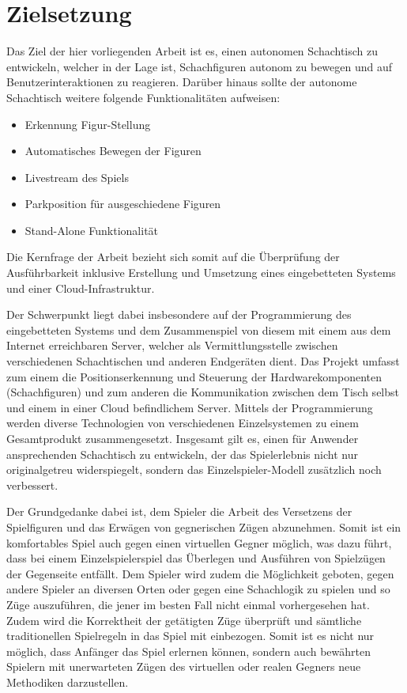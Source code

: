 \hypertarget{zielsetzung}{%
\section{Zielsetzung}\label{zielsetzung}}

Das Ziel der hier vorliegenden Arbeit ist es, einen autonomen
Schachtisch zu entwickeln, welcher in der Lage ist, Schachfiguren
autonom zu bewegen und auf Benutzerinteraktionen zu reagieren. Darüber
hinaus sollte der autonome Schachtisch weitere folgende Funktionalitäten
aufweisen:

\begin{itemize}
\tightlist
\item
  Erkennung Figur-Stellung
\item
  Automatisches Bewegen der Figuren
\item
  Livestream des Spiels
\item
  Parkposition für ausgeschiedene Figuren
\item
  Stand-Alone Funktionalität
\end{itemize}

Die Kernfrage der Arbeit bezieht sich somit auf die Überprüfung der
Ausführbarkeit inklusive Erstellung und Umsetzung eines eingebetteten
Systems und einer Cloud-Infrastruktur.

Der Schwerpunkt liegt dabei insbesondere auf der Programmierung des
eingebetteten Systems und dem Zusammenspiel von diesem mit einem aus dem
Internet erreichbaren Server, welcher als Vermittlungsstelle zwischen
verschiedenen Schachtischen und anderen Endgeräten dient. Das Projekt
umfasst zum einem die Positionserkennung und Steuerung der
Hardwarekomponenten (Schachfiguren) und zum anderen die Kommunikation
zwischen dem Tisch selbst und einem in einer Cloud befindlichem Server.
Mittels der Programmierung werden diverse Technologien von verschiedenen
Einzelsystemen zu einem Gesamtprodukt zusammengesetzt. Insgesamt gilt
es, einen für Anwender ansprechenden Schachtisch zu entwickeln, der das
Spielerlebnis nicht nur originalgetreu widerspiegelt, sondern das
Einzelspieler-Modell zusätzlich noch verbessert.

Der Grundgedanke dabei ist, dem Spieler die Arbeit des Versetzens der
Spielfiguren und das Erwägen von gegnerischen Zügen abzunehmen. Somit
ist ein komfortables Spiel auch gegen einen virtuellen Gegner möglich,
was dazu führt, dass bei einem Einzelspielerspiel das Überlegen und
Ausführen von Spielzügen der Gegenseite entfällt. Dem Spieler wird zudem
die Möglichkeit geboten, gegen andere Spieler an diversen Orten oder
gegen eine Schachlogik zu spielen und so Züge auszuführen, die jener im
besten Fall nicht einmal vorhergesehen hat. Zudem wird die Korrektheit
der getätigten Züge überprüft und sämtliche traditionellen Spielregeln
in das Spiel mit einbezogen. Somit ist es nicht nur möglich, dass
Anfänger das Spiel erlernen können, sondern auch bewährten Spielern mit
unerwarteten Zügen des virtuellen oder realen Gegners neue Methodiken
darzustellen.

